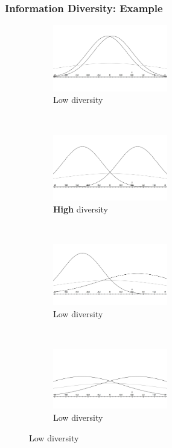 \documentclass{beamer}
\begin{document}
\begin{frame}
\frametitle{Information Diversity: Example}
\begin{figure}
\label{fig:diversity}
        \centering
         \begin{subfigure}[b]{0.45\textwidth}
        	        \centering
                \includegraphics[width=50mm]{figures/diversity1.jpg}
                \caption{Low diversity}
        \end{subfigure}
              ~ %
        \begin{subfigure}[b]{0.45\textwidth}
		 \centering
                \includegraphics[width=50mm]{figures/diversity2.jpg}
                \caption{{\bf High} diversity}
        \end{subfigure}
       ~ %
        \begin{subfigure}[b]{0.45\textwidth}
		 \centering
                \includegraphics[width=50mm]{figures/diversity3.jpg}
\caption{Low diversity}
        \end{subfigure}
       ~ %
        \begin{subfigure}[b]{0.45\textwidth}
		 \centering
                \includegraphics[width=50mm]{figures/diversity4.jpg}
\caption{Low diversity}
        \end{subfigure}
\end{figure}
\end{frame}
\end{document}
